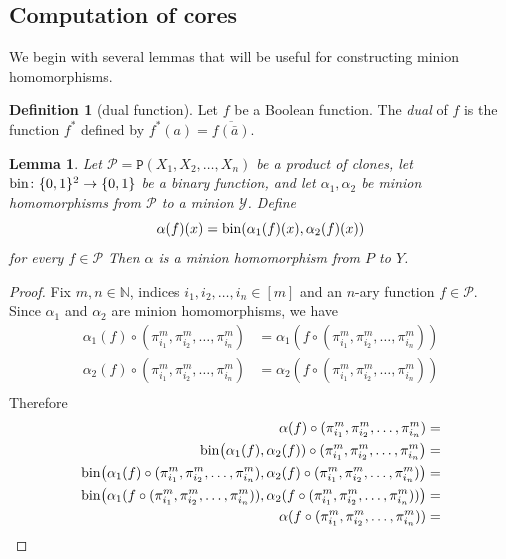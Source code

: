 \documentclass{amsart}
\numberwithin{equation}{section}
\theoremstyle{plain}
\newtheorem{lemma}[theorem]{Lemma}
\theoremstyle{definition}
\newtheorem{definition}[theorem]{Definition}
\def\clone#1{\mathcal{#1}}
\def\minion#1{\mathcal{#1}}
\def\C#1{{\mathtt{P}}(#1)}
\begin{document}
\subsection{Computation of cores}

We begin with several lemmas that will be useful for constructing minion homomorphisms.

\begin{definition}[dual function] 
Let $f$ be a Boolean function. The {\em dual} of $f$ is the function $f^*$ defined by $f^*(a) = \overline{f(\bar{a})}$.
\end{definition}

\begin{lemma}
  \label{binary-minion-homomorphism}
  Let $\clone{P} = \C{X_1,X_2,\dots,X_n}$ be a product of clones, let $\rm bin\colon \{0,1\}^2\to\{0,1\}$ be a binary function, and let $\alpha_1,\alpha_2$ be minion homomorphisms from $\clone{P}$ to a minion $\minion{Y}$.
  Define
  $$\alpha(f)(x) ={\rm bin}(\alpha_1(f)(x), \alpha_2(f)(x))$$
  for every $f\in\clone{P}$
  Then $\alpha$ is a minion homomorphism from $P$ to $Y$.
\end{lemma}
\begin{proof}
  Fix $m,n\in\mathbb N$, indices $i_1,i_2,\dots,i_n\in[m]$ and an $n$-ary function $f\in\clone{P}$. Since $\alpha_1$ and $\alpha_2$ are minion homomorphisms, we have
\begin{align*}
  \alpha_1(f)\circ(\pi_{i_1}^m,\pi_{i_2}^m,\dots,\pi_{i_n}^m) &= \alpha_1(f\circ(\pi_{i_1}^m,\pi_{i_2}^m,\dots,\pi_{i_n}^m)) \\
  \alpha_2(f)\circ(\pi_{i_1}^m,\pi_{i_2}^m,\dots,\pi_{i_n}^m) &= \alpha_2(f\circ(\pi_{i_1}^m,\pi_{i_2}^m,\dots,\pi_{i_n}^m)) \\
\end{align*}
Therefore
\begin{align*}
  \alpha(f)\circ(\pi_{i_1}^m,\pi_{i_2}^m,\dots,\pi_{i_n}^m) &= \\
        {\rm bin}\big(\alpha_1(f),\alpha_2(f))\circ( \pi_{i_1}^m,\pi_{i_2}^m,\dots,\pi_{i_n}^m\big) &= \\
        {\rm bin}\big(\alpha_1(f) \circ( \pi_{i_1}^m,\pi_{i_2}^m,\dots,\pi_{i_n}^m),\alpha_2(f) \circ( \pi_{i_1}^m,\pi_{i_2}^m,\dots,\pi_{i_n}^m)\big) &= \\
        {\rm bin}\big(\alpha_1(f \circ( \pi_{i_1}^m,\pi_{i_2}^m,\dots,\pi_{i_n}^m)),\alpha_2(f \circ( \pi_{i_1}^m,\pi_{i_2}^m,\dots,\pi_{i_n}^m))\big) &= \\
        \alpha(f \circ(\pi_{i_1}^m,\pi_{i_2}^m,\dots,\pi_{i_n}^m)) &= \\
\end{align*}
\end{proof}
\end{document}
